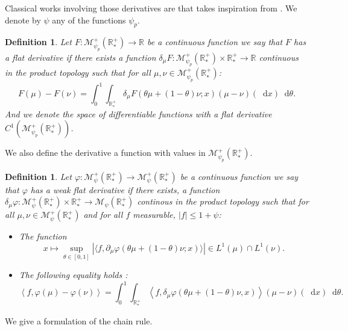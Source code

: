\documentclass[11pt,a4paper]{article}
\newcommand{\RR}{\mathbb{R}}
\newcommand{\RRP}{\mathbb{R}^+_*}
\newcommand{\MC}{\mathcal{M}}
\newcommand{\dd}{\mathop{}\!\mathrm{d}}
\newtheorem{definition}[theorem]{Definition}
\begin{document}
Classical works involving those derivatives are \cite{martiniKolmogorovEquationsSpaces2023} that takes inspiration from \cite{cardaliaguet2019master,carmona2018probabilistic}. We denote by $\psi$ any of the functions $\psi_p$.
\begin{definition}
    Let $F: \MC^+_{\psi_p}(\RRP) \to \RR$ be a continuous function we say that $F$ has a flat derivative if there exists a function $\delta_{\mu}F :\MC^+_{\psi_p}(\RRP) \times \RRP \to \RR $ continuous in the product topology such that for all $\mu,\nu \in \MC^+_{\psi_p}(\RRP) $:
    \[ F(\mu) - F(\nu) = \int_0^1 \int_{\RRP} \delta_\mu F(\theta \mu + (1-\theta)\nu;x)\left(\mu - \nu\right)(\dd x)\dd \theta.\]
    And we denote the space of differentiable functions with a flat derivative $C^1(\MC_{\psi_p}^+(\RRP))$.
\end{definition}
We also define the derivative a function with values in $\MC^+_{\psi_p}(\RRP) $.
\begin{definition}
     Let $\varphi: \MC^+_{\psi}(\RRP) \to \MC^+_{\psi}(\RRP)$ be a continuous function we say that $\varphi$ has a weak flat derivative if there exists, a function $\delta_{\mu}\varphi :\MC^+_{\psi}(\RRP) \times \RRP \to \MC_{\psi}(\RRP)$ continous in the product topology such that for all $\mu,\nu \in \MC^+_{\psi}(\RRP)$ and for all $f$ measurable, $|f| \leq 1 + \psi$:
     \begin{itemize}
         \item The function
         \[x \mapsto \sup_{\theta \in [0,1]} |\langle f, \partial_\mu\varphi(\theta \mu + (1-\theta) \nu;x) \rangle| \in L^1(\mu) \cap L^1(\nu).\]
        \item The following equality holds :
            \[ \left\langle f,\varphi(\mu) - \varphi(\nu) \right\rangle= \int_0^1 \int_{\RRP} \left\langle f,\delta_\mu \varphi(\theta \mu + (1-\theta)\nu,x)\right\rangle\left(\mu - \nu\right)(\dd x)\dd \theta.\]
     \end{itemize}
\end{definition}
We give a formulation of the chain rule.
\end{document}
